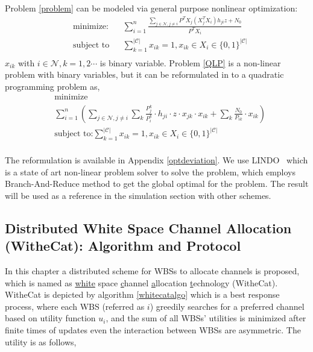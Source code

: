 Problem \ref{problem} can be modeled via general purpose nonlinear optimization:
	\begin{equation}
\label{QLP}
		\begin{aligned}
		& \underset{}{\text{minimize:}}
		& & \sum\limits^{n}_{i=1} \frac{\sum\limits_{j\in\mathcal{N}, j\neq i}P^TX_j(X_j^TX_i)h_{ji}z + N_0}{P^TX_i}\\
		& \text{subject to}
		& & \sum\limits_{k=1}^{|\mathcal{C}|}x_{ik}=1, x_{ik}\in X_i\in \{0,1\}^{|\mathcal{C}|}\\
		\end{aligned}
	\end{equation}
$x_{ik}$ with $i\in \mathcal{N}, k=1,2\cdots$ is binary variable. Problem \ref{QLP} is a non-linear problem with binary variables, but it can be reformulated in to a quadratic programming problem as,
	\begin{equation}
\label{QLP_2}
			\begin{aligned}
			& \underset{}{\text{minimize}}\\
			&\sum\limits^{n}_{i=1}(\sum\limits_{j\in\mathcal{N}, j\neq i}\sum\limits_k \frac{P_{j}^k}{P_{i}^k}\cdot h_{ji}\cdot z\cdot x_{jk}\cdot x_{ik} + \sum\limits_k \frac{N_0}{P_{ik}}\cdot x_{ik})\\
			& \text{subject to:} 
			\sum\limits_{k=1}^{|\mathcal{C}|}x_{ik}=1, x_{ik}\in X_i\in \{0,1\}^{|\mathcal{C}|}\\
			\end{aligned}
		\end{equation}

The reformulation is available in Appendix \ref{optdeviation}. We use LINDO~\cite{lindo} which is a state of art non-linear problem solver to solve the problem, which employs Branch-And-Reduce method to get the global optimal for the problem. %
The result will be used as a reference in the simulation section with other schemes. 



\subsection{Distributed White Space Channel Allocation (WitheCat): Algorithm and Protocol}
\label{whitecat}
In this chapter a distributed scheme for WBSs to allocate channels is proposed,  which is named as \underline{white} space \underline{c}hannel \underline{a}llocation \underline{t}echnology (WitheCat). WitheCat is depicted by algorithm \ref{whitecatalgo} which is a best response process, where each WBS (referred as $i$) greedily searches for a preferred channel based on utility function $u_i$, and the sum of all WBSs' utilities is minimized after finite times of updates even the interaction between WBSs are asymmetric. The utility is as follows,

